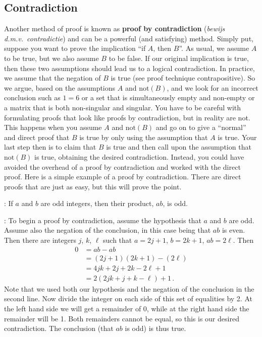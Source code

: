 \subsection{Contradiction}
Another method of proof is known as \textbf{proof by contradiction} (\textit{bewijs d.m.v.\ contradictie}) and can be a powerful (and satisfying) method. Simply put, suppose you want to prove the implication ``if $A$, then $B$''. As usual, we assume $A$ to be true, but we also assume $B$ to be false. If our original implication is true, then these two assumptions should lead us to a logical contradiction. In practice, we assume that the negation of $B$ is true (see proof technique contrapositive). So we argue, based on the assumptions $A$ and $\text{not}(B)$, and we look for an incorrect conclusion such as $1=6$ or a set that is simultaneously empty and non-empty or a matrix that is both non-singular and singular.
%
You have to be careful with formulating proofs that look like proofs by contradiction, but in reality are not. This happens when you assume $A$ and $\text{not}(B)$ and go on to give a ``normal'' and direct proof that $B$ is true by only using the assumption that $A$ is true. Your last step then is to claim that $B$ is true and then call upon the assumption that $\text{not}(B)$ is true, obtaining the desired contradiction. Instead, you could have avoided the overhead of a proof by contradiction and worked with the direct proof.
%
Here is a simple example of a proof by contradiction. There are direct proofs that are just as easy, but this will prove the point.

: If $a$ and $b$ are odd integers, then their product, $ab$, is odd.

:  To begin a proof by contradiction, assume the hypothesis that $a$ and $b$ are odd. Assume also the negation of the conclusion, in this case being that $ab$ is even. Then there are integers $j$, $k$, $\ell$ such that $a=2j+1$, $b=2k+1$, $ab=2\ell$. Then
%
\begin{align*}
0
&=ab-ab\\
&=(2j+1)(2k+1)-(2\ell)\\
&=4jk+2j+2k-2\ell+1\\
&=2\left(2jk+j+k-\ell\right)+1\,.
\end{align*}
%
Note that we used both our hypothesis and the negation of the conclusion in the second line. Now divide the integer on each side of this set of equalities by 2. At the left hand side we will get a remainder of 0, while at the right hand side the remainder will be 1. Both remainders cannot be equal, so this is our desired contradiction. The conclusion (that $ab$ is odd) is thus true.
%

